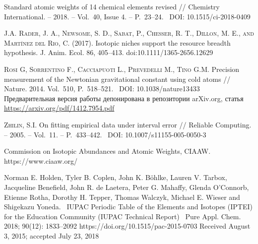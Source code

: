 \documentclass[a5paper,openany]{book}
\begin{document}
\begin{thebibliography}{00}
	Standard atomic weights of 14 chemical elements revised // Chemistry International. 
	-- 2018. -- Vol.~40, Issue 4. -- P.~23--24. \  DOI: 10.1515/ci-2018-0409 


	\textsc{J.A. Rader, J. A., Newsome, S. D., Sabat, P., Chesser, R. T., Dillon, M. E., and Martínez del Rio, C.} (2017). Isotopic niches support the resource breadth hypothesis. J. Anim. Ecol. 86, 405–413. doi:10.1111/1365-2656.12629
	
	\textsc{Rosi G, Sorrentino F., Cacciapuoti L., Prevedelli M., Tino G.M.} 
	Precision measurement of the Newtonian gravitational constant using cold atoms //  
	Nature. 2014. Vol.~510, P.~518--521. \  DOI: 10.1038/nature13433  \\   
	Предварительная версия работы депонирована в репозитории arXiv.org, статья 
	\url{https://arxiv.org/pdf/1412.7954.pdf}
	
	
	\textsc{Zhilin, S.I.} On fitting empirical data under interval error // 
	Reliable Computing. -- 2005. -- Vol.~11. -- P.~433--442. \ DOI: 10.1007/s11155-005-0050-3 
	

Commission on Isotopic Abundances and Atomic Weights, CIAAW.
https://www.ciaaw.org/

 Norman E. Holden, Tyler B. Coplen, John K. B\"{o}hlke, Lauren V. Tarbox, Jacqueline Benefield, John R. de Laetera, Peter G. Mahaffy, Glenda O’Connorb, Etienne Rotha,
Dorothy H. Tepper, Thomas Walczyk, Michael E. Wieser and Shigekazu Yoneda. \
IUPAC Periodic Table of the Elements and Isotopes (IPTEI) for the Education Community
(IUPAC Technical Report) \ Pure Appl. Chem. 2018; 90(12): 1833–2092
https://doi.org/10.1515/pac-2015-0703
Received August 3, 2015; accepted July 23, 2018


\end{thebibliography}
\end{document}
